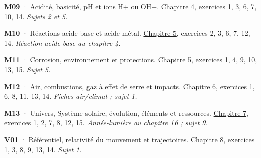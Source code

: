 \par\noindent\begin{minipage}{\linewidth}\textbf{M09} · Acidité, basicité, pH et ions H+ ou OH−. \hyperref[chap-4]{Chapitre 4}, exercices 1, 3, 6, 7, 10, 14. \emph{Sujets 2 et 5.}\par\end{minipage}\par\vspace{2mm}
\par\noindent\begin{minipage}{\linewidth}\textbf{M10} · Réactions acide-base et acide-métal. \hyperref[chap-5]{Chapitre 5}, exercices 2, 3, 6, 7, 12, 14. \emph{Réaction acide-base au chapitre 4.}\par\end{minipage}\par\vspace{2mm}
\par\noindent\begin{minipage}{\linewidth}\textbf{M11} · Corrosion, environnement et protections. \hyperref[chap-5]{Chapitre 5}, exercices 1, 4, 9, 10, 13, 15. \emph{Sujet 5.}\par\end{minipage}\par\vspace{2mm}
\par\noindent\begin{minipage}{\linewidth}\textbf{M12} · Air, combustions, gaz à effet de serre et impacts. \hyperref[chap-6]{Chapitre 6}, exercices 1, 6, 8, 11, 13, 14. \emph{Fiches air/climat ; sujet 1.}\par\end{minipage}\par\vspace{2mm}
\par\noindent\begin{minipage}{\linewidth}\textbf{M13} · Univers, Système solaire, évolution, éléments et ressources. \hyperref[chap-7]{Chapitre 7}, exercices 1, 2, 7, 8, 12, 15. \emph{Année-lumière au chapitre 16 ; sujet 9.}\par\end{minipage}\par\vspace{2mm}
\par\noindent\begin{minipage}{\linewidth}\textbf{V01} · Référentiel, relativité du mouvement et trajectoires. \hyperref[chap-8]{Chapitre 8}, exercices 1, 3, 8, 9, 13, 14. \emph{Sujet 1.}\par\end{minipage}\par\vspace{2mm}
